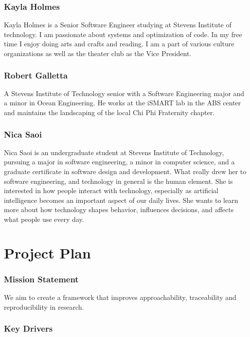 \subsection{Kayla Holmes}
Kayla Holmes is a Senior Software Engineer studying at Stevens Institute of technology. I am passionate about systems and optimization of code. In my free time I enjoy doing arts and crafts and reading. I am a part of various culture organizations as well as the theater club as the Vice President.

\subsection{Robert Galletta}
A Stevens Institute of Technology senior with a Software Engineering major and a minor in Ocean Engineering. He works at the iSMART lab in the ABS center and maintains the landscaping of the local Chi Phi Fraternity chapter. 

\subsection{Nica Saoi}
Nica Saoi is an undergraduate student at Stevens Institute of Technology, pursuing a major in software engineering, a minor in computer science, and a graduate certificate in software design and development. What really drew her to software engineering, and technology in general is the human element. She is interested in how people interact with technology, especially as artificial intelligence becomes an important aspect of our daily lives. She wants to learn more about how technology shapes behavior, influences decisions, and affects what people use every day.

\chapter{Project Plan}
\subsection{Mission Statement}
We aim to create a framework that improves \gls{approachability}, traceability and \gls{reproducibility} in research.

\subsection{Key Drivers}

